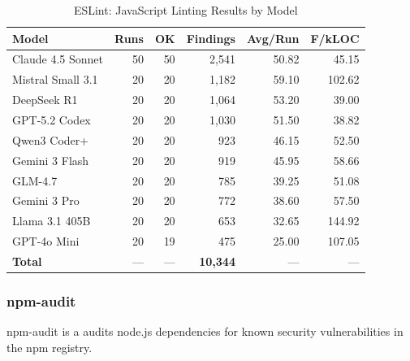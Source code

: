 \begin{table}[htbp]
    \centering
    \caption{ESLint: JavaScript Linting Results by Model}
    \label{tab:tool_eslint}
    \small
    \begin{tabular}{@{} l r r r r r @{}}
        \toprule
        \textbf{Model} & \textbf{Runs} & \textbf{OK} & \textbf{Findings} & \textbf{Avg/Run} & \textbf{F/kLOC} \\
        \midrule
        Claude 4.5 Sonnet & 50 & 50 & 2{,}541 & 50.82 & 45.15 \\
        Mistral Small 3.1 & 20 & 20 & 1{,}182 & 59.10 & 102.62 \\
        DeepSeek R1 & 20 & 20 & 1{,}064 & 53.20 & 39.00 \\
        GPT-5.2 Codex & 20 & 20 & 1{,}030 & 51.50 & 38.82 \\
        Qwen3 Coder+ & 20 & 20 & 923 & 46.15 & 52.50 \\
        Gemini 3 Flash & 20 & 20 & 919 & 45.95 & 58.66 \\
        GLM-4.7 & 20 & 20 & 785 & 39.25 & 51.08 \\
        Gemini 3 Pro & 20 & 20 & 772 & 38.60 & 57.50 \\
        Llama 3.1 405B & 20 & 20 & 653 & 32.65 & 144.92 \\
        GPT-4o Mini & 20 & 19 & 475 & 25.00 & 107.05 \\
        \midrule
        \textbf{Total} & --- & --- & \textbf{10{,}344} & --- & --- \\
        \bottomrule
    \end{tabular}
\end{table}

\subsubsection{npm-audit}

npm-audit is a audits node.js dependencies for known security vulnerabilities in the npm registry.

